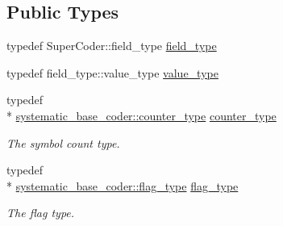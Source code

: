 \subsection*{Public Types}
\begin{DoxyCompactItemize}
\item 
typedef Super\-Coder\-::field\-\_\-type \hyperlink{classkodo_1_1base__systematic__encoder_a15767452364727895710efc393ba58ae}{field\-\_\-type}
\begin{DoxyCompactList}\small\item\em \end{DoxyCompactList}\item 
typedef field\-\_\-type\-::value\-\_\-type \hyperlink{classkodo_1_1base__systematic__encoder_af12f2b02d4ca393d7728abd7772d2650}{value\-\_\-type}
\begin{DoxyCompactList}\small\item\em \end{DoxyCompactList}\item 
\hypertarget{classkodo_1_1base__systematic__encoder_a78fc43be3124e05bd807586438206ae1}{typedef \\*
\hyperlink{classkodo_1_1systematic__base__coder_ae380cbb615817050943c82186714025c}{systematic\-\_\-base\-\_\-coder\-::counter\-\_\-type} \hyperlink{classkodo_1_1base__systematic__encoder_a78fc43be3124e05bd807586438206ae1}{counter\-\_\-type}}\label{classkodo_1_1base__systematic__encoder_a78fc43be3124e05bd807586438206ae1}

\begin{DoxyCompactList}\small\item\em The symbol count type. \end{DoxyCompactList}\item 
\hypertarget{classkodo_1_1base__systematic__encoder_a61921e52a4d2258731671c96d660a2e6}{typedef \\*
\hyperlink{classkodo_1_1systematic__base__coder_a5bf58be17746f35c5533306610a20181}{systematic\-\_\-base\-\_\-coder\-::flag\-\_\-type} \hyperlink{classkodo_1_1base__systematic__encoder_a61921e52a4d2258731671c96d660a2e6}{flag\-\_\-type}}\label{classkodo_1_1base__systematic__encoder_a61921e52a4d2258731671c96d660a2e6}

\begin{DoxyCompactList}\small\item\em The flag type. \end{DoxyCompactList}\end{DoxyCompactItemize}
